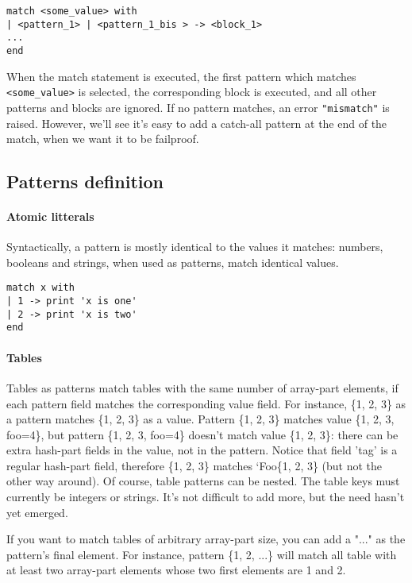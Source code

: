 \begin{verbatim}
match <some_value> with
| <pattern_1> | <pattern_1_bis > -> <block_1>
...
end
\end{verbatim}

When the match statement is executed, the first pattern which matches
{\tt<some\_value>} is selected, the corresponding block is executed, and all
other patterns and blocks are ignored. If no pattern matches, an error
{\tt"mismatch"} is raised. However, we'll see it's easy to add a catch-all
pattern at the end of the match, when we want it to be failproof.

\subsection{Patterns definition}

\paragraph{Atomic litterals}
Syntactically, a pattern is mostly identical to the values it matches: numbers,
booleans and strings, when used as patterns, match identical values.

\begin{verbatim}
match x with
| 1 -> print 'x is one'
| 2 -> print 'x is two'
end
\end{verbatim}

\paragraph{Tables}
Tables as patterns match tables with the same number of array-part elements, if
each pattern field matches the corresponding value field. For instance, \{1, 2,
3\} as a pattern matches \{1, 2, 3\} as a value. Pattern \{1, 2, 3\} matches
value \{1, 2, 3, foo=4\}, but pattern \{1, 2, 3, foo=4\} doesn't match value
\{1, 2, 3\}: there can be extra hash-part fields in the value, not in the
pattern. Notice that field 'tag' is a regular hash-part field, therefore \{1, 2,
3\} matches `Foo\{1, 2, 3\} (but not the other way around). Of course, table
patterns can be nested. The table keys must currently be integers or strings.
It's not difficult to add more, but the need hasn't yet emerged.

If you want to match tables of arbitrary array-part size, you can add a "..." as
the pattern's final element. For instance, pattern \{1, 2, ...\} will match all
table with at least two array-part elements whose two first elements are 1 and
2.

